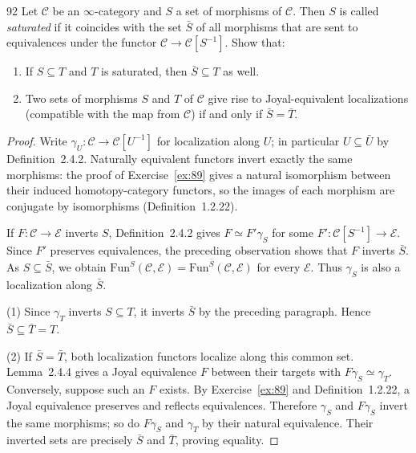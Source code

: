 \begin{exercise}{92}
Let $\mathcal C$ be an $\infty$-category and $S$ a set of morphisms of $\mathcal C$.
Then $S$ is called \emph{saturated} if it coincides with the set $\bar{S}$ of all
morphisms that are sent to equivalences under the functor
$\mathcal C\to\mathcal C[S^{-1}]$. Show that:
\begin{enumerate}[label=(\arabic*)]
\item If $S\subseteq T$ and $T$ is saturated, then $\bar{S}\subseteq T$ as well.
\item Two sets of morphisms $S$ and $T$ of $\mathcal C$ give rise to Joyal-equivalent
localizations (compatible with the map from $\mathcal C$) if and only if
$\bar{S}=\bar{T}$.
\end{enumerate}

\begin{proof}
Write $\gamma_U\colon\mathcal C\to\mathcal C[U^{-1}]$ for localization along
$U$; in particular $U\subseteq\bar{U}$ by Definition~2.4.2.
Naturally equivalent functors invert exactly the same morphisms:
the proof of Exercise~\ref{ex:89} gives a natural isomorphism between their
induced homotopy-category functors, so the images of each morphism are
conjugate by isomorphisms (Definition~1.2.22).

If $F\colon\mathcal C\to\mathcal E$ inverts $S$, Definition~2.4.2 gives
$F\simeq F'\gamma_S$ for some $F'\colon\mathcal C[S^{-1}]\to\mathcal E$.
Since $F'$ preserves equivalences, the preceding observation shows that
$F$ inverts $\bar{S}$.
As $S\subseteq\bar{S}$, we obtain
$\mathrm{Fun}^S(\mathcal C,\mathcal E)
=\mathrm{Fun}^{\bar{S}}(\mathcal C,\mathcal E)$
for every $\mathcal E$.
Thus $\gamma_S$ is also a localization along $\bar{S}$.

(1) Since $\gamma_T$ inverts $S\subseteq T$, it inverts $\bar{S}$ by the
preceding paragraph. Hence $\bar{S}\subseteq\bar{T}=T$.

(2) If $\bar{S}=\bar{T}$, both localization functors localize along this
common set. Lemma~2.4.4 gives a Joyal equivalence $F$ between their targets
with $F\gamma_S\simeq\gamma_T$.
Conversely, suppose such an $F$ exists.
By Exercise~\ref{ex:89} and Definition~1.2.22, a Joyal equivalence preserves
and reflects equivalences.
Therefore $\gamma_S$ and $F\gamma_S$ invert the same morphisms;
so do $F\gamma_S$ and $\gamma_T$ by their natural equivalence.
Their inverted sets are precisely $\bar{S}$ and $\bar{T}$, proving equality.
\end{proof}
\end{exercise}
